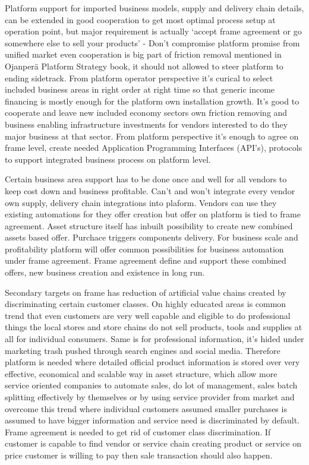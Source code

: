 Platform support for imported business models, supply and delivery chain
details, can be extended in good cooperation to get most optimal process setup
at operation point, but major requirement is actually `accept frame agreement
or go somewhere else to sell your products' - Don't compromise platform
promise from unified market even cooperation is big part of friction removal
mentioned in Ojanper\"a Platform Strategy book\allowbreak\cite{
ojanpera2021platform}, it should not allowed to steer platform to ending
sidetrack. From platform operator perspective it's curical to select included
business areas in right order at right time so that generic income financing
is mostly enough for the platform own installation growth. It's good to
cooperate and leave new included economy sectors own friction removing and
business enabling infrastructure investments for vendors interested to do they
major business at that sector. From platform perspective it's enough to agree
on frame level, create needed Application Programming Interfaces (API's),
protocols to support integrated business process on platform level.

Certain business area support has to be done once and well for all vendors to
keep cost down and business profitable. Can't and won't integrate every vendor
own supply, delivery chain integrations into plaform. Vendors can use they
existing automations for they offer creation but offer on platform is tied to
frame agreement. Asset structure itself has inbuilt possibility to create new
combined assets based offer. Purchace triggers components delivery. For
business scale and profitability platform will offer common possibilities for
business automation under frame agreement. Frame agreement define and support
these combined offers, new business creation and existence in long run.

Secondary targets on frame has reduction of artificial value chains created
by discriminating certain customer classes. On highly educated areas is common
trend that even customers are very well capable and eligible to do
professional things the local stores and store chains do not sell products,
tools and supplies at all for individual consumers. Same is for professional
information, it's hided under marketing trash pushed through search engines
and social media. Therefore platform is needed where detailed official product
information is stored over very effective, economical and scalable way in
asset structure, which allow more service oriented companies to automate
sales, do lot of management, sales batch splitting effectively by themselves
or by using service provider from market and overcome this trend where
individual customers assumed smaller purchases is assumed to have bigger
information and service need is discriminated by default. Frame agreement is
needed to get rid of customer class discrimination. If customer is capable to
find vendor or service chain creating product or service on price customer is
willing to pay then sale transaction should also happen.

